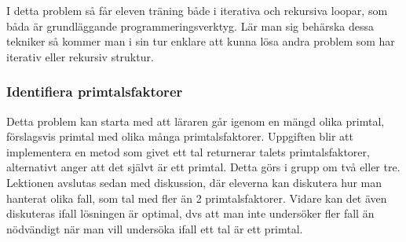     \textcolor{WildStrawberry}{
        I detta problem så får eleven träning både i iterativa och rekursiva loopar, som båda  är grundläggande programmeringsverktyg. Lär man sig behärska dessa tekniker så kommer man i sin tur enklare att kunna lösa andra problem som har iterativ eller rekursiv struktur.}

%    
%    
    
\subsubsection{Identifiera primtalsfaktorer}
    \label{sec:primtal}
    
    \textcolor{WildStrawberry}{
        Detta problem kan starta med att läraren går igenom en mängd olika primtal, förslagsvis primtal med olika många primtalsfaktorer. Uppgiften blir att implementera en metod som givet ett tal returnerar talets primtalsfaktorer, alternativt anger att det självt är ett primtal. Detta görs i grupp om två eller tre. Lektionen avslutas sedan med diskussion, där eleverna kan diskutera hur man hanterat olika fall, som tal med fler än 2 primtalsfaktorer. Vidare kan det även diskuteras ifall lösningen är optimal, dvs att man inte undersöker fler fall än nödvändigt när man vill undersöka ifall ett tal är ett primtal.
        }
        
